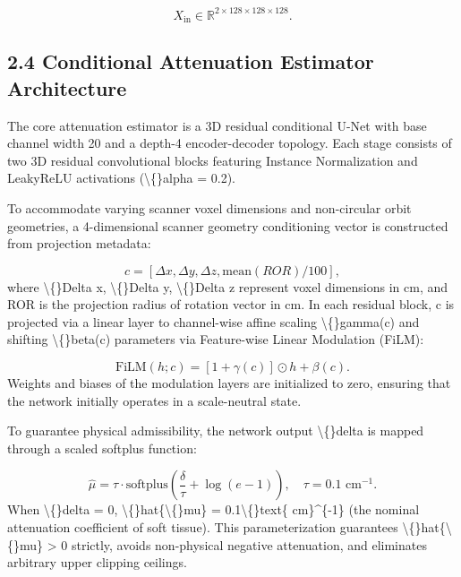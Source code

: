 \documentclass[11pt]{article}
\begin{document}
\begin{equation*}X_{\text{in}} \in \mathbb{R}^{2 \times 128 \times 128 \times 128}.\end{equation*}
\subsection*{2.4 Conditional Attenuation Estimator Architecture}
The core attenuation estimator is a 3D residual conditional U-Net with base channel width 20 and a depth-4 encoder-decoder topology. Each stage consists of two 3D residual convolutional blocks featuring Instance Normalization and LeakyReLU activations (\textbackslash\{\}alpha = 0.2).\par

To accommodate varying scanner voxel dimensions and non-circular orbit geometries, a 4-dimensional scanner geometry conditioning vector is constructed from projection metadata:\par

\begin{equation*}c = [\Delta x, \Delta y, \Delta z, \text{mean}(ROR) / 100],\end{equation*}
where \textbackslash\{\}Delta x, \textbackslash\{\}Delta y, \textbackslash\{\}Delta z represent voxel dimensions in cm, and ROR is the projection radius of rotation vector in cm. In each residual block, c is projected via a linear layer to channel-wise affine scaling \textbackslash\{\}gamma(c) and shifting \textbackslash\{\}beta(c) parameters via Feature-wise Linear Modulation (FiLM):\par

\begin{equation*}\text{FiLM}(h; c) = [1 + \gamma(c)] \odot h + \beta(c).\end{equation*}
Weights and biases of the modulation layers are initialized to zero, ensuring that the network initially operates in a scale-neutral state.\par

To guarantee physical admissibility, the network output \textbackslash\{\}delta is mapped through a scaled softplus function:\par

\begin{equation*}\hat{\mu} = \tau \cdot \text{softplus}\left(\frac{\delta}{\tau} + \log(e - 1)\right), \quad \tau = 0.1\text{ cm}^{-1}.\end{equation*}
When \textbackslash\{\}delta = 0, \textbackslash\{\}hat\{\textbackslash\{\}mu\} = 0.1\textbackslash\{\}text\{ cm\}\textasciicircum{}\{-1\} (the nominal attenuation coefficient of soft tissue). This parameterization guarantees \textbackslash\{\}hat\{\textbackslash\{\}mu\} > 0 strictly, avoids non-physical negative attenuation, and eliminates arbitrary upper clipping ceilings.\par
\end{document}
